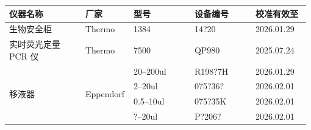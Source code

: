 \documentclass[UTF8,10pt,a4paper,fontset=fandol]{ctexart}
\newcommand{\fieldvalue}[1]{#1}
\newcommand{\handwritten}[1]{#1}
\begin{document}
\begin{tabular}{|p{0.25\linewidth}|p{0.15\linewidth}|p{0.20\linewidth}|p{0.20\linewidth}|p{0.18\linewidth}|}
\hline
仪器名称 & 厂家 & 型号 & 设备编号 & 校准有效至\\
\hline
生物安全柜 & Thermo & 1384 &
\fieldvalue{\handwritten{14?20}} &
\fieldvalue{\handwritten{2026.01.29}}\\
\hline
实时荧光定量 PCR 仪 & Thermo & 7500 &
\fieldvalue{\handwritten{QP980}} &
\fieldvalue{\handwritten{2025.07.24}}\\
\hline
\multirow{4}{*}{移液器} & \multirow{4}{*}{Eppendorf} &
\fieldvalue{\handwritten{20--200ul}} &
\fieldvalue{\handwritten{R198?7H}} &
\fieldvalue{\handwritten{2026.01.29}}\\
\cline{3-5}
& &
\fieldvalue{\handwritten{2--20ul}} &
\fieldvalue{\handwritten{075?36?}} &
\fieldvalue{\handwritten{2026.02.01}}\\
\cline{3-5}
& &
\fieldvalue{\handwritten{0.5--10ul}} &
\fieldvalue{\handwritten{075?35K}} &
\fieldvalue{\handwritten{2026.02.01}}\\
\cline{3-5}
& &
\fieldvalue{\handwritten{?--20ul}} &
\fieldvalue{\handwritten{P?206?}} &
\fieldvalue{\handwritten{2026.02.01}}\\
\hline
\end{tabular}
\end{document}
